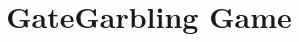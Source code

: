\documentclass[a3paper]{article}
\title{GateGarbling Game}
\theoremstyle{definition}
\begin{document}
\maketitle
\begin{center}

\end{center}
\begin{pchstack}

\pchspace

\pchspace
\end{pchstack}
\end{document}
